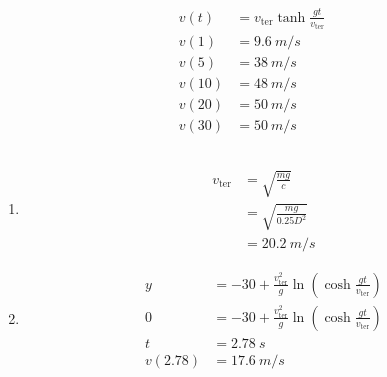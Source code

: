 \documentclass{article}
\begin{document}
\setcounter{subsection}{28}
\subsection{}

\begin{align*}
  v(t)  & = v_\text{ter} \tanh \frac{g t}{v_\text{ter}} \\
  v(1)  & = \qty{9.6}{m/s}                              \\
  v(5)  & = \qty{38}{m/s}                               \\
  v(10) & = \qty{48}{m/s}                               \\
  v(20) & = \qty{50}{m/s}                               \\
  v(30) & = \qty{50}{m/s}
\end{align*}

\setcounter{subsection}{30}
\subsection{}

\begin{enumerate}
  \item

        \begin{align*}
          v_\text{ter} & = \sqrt{\frac{m g}{c}}        \\
                       & = \sqrt{\frac{m g}{0.25 D^2}} \\
                       & = \qty{20.2}{m/s}
        \end{align*}

  \item

        \begin{align*}
          y       & = -30 + \frac{v_\text{ter}^2}{g} \ln \left( \cosh \frac{g t}{v_\text{ter}} \right) \\
          0       & = -30 + \frac{v_\text{ter}^2}{g} \ln \left( \cosh \frac{g t}{v_\text{ter}} \right) \\
          t       & = \qty{2.78}{s}                                                                    \\
          v(2.78) & = \qty{17.6}{m/s}
        \end{align*}
\end{enumerate}

\setcounter{subsection}{32}
\subsection{}
\end{document}
